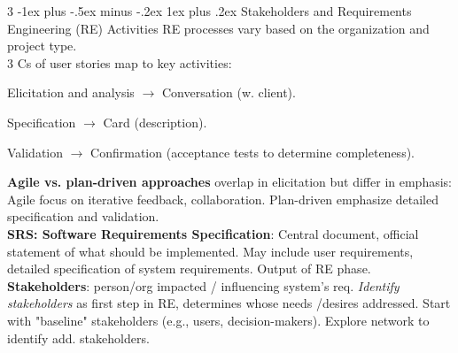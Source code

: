 \documentclass[a4paper, 10pt, landscape]{article}
\makeatletter
\renewcommand{\subsubsection}{\@startsection{subsubsection}{3}{0mm}%
                                {-1ex plus -.5ex minus -.2ex}%
                                {1ex plus .2ex}%
                                {\normalfont\small\bfseries}}
\makeatother
\begin{document}
\begin{multicols*}{3}
\subsubsection{Stakeholders and Requirements Engineering (RE) Activities}
 RE processes vary based on the organization and project type. \\
3 Cs of user stories map to key activities:   \\
\centerline{Elicitation and analysis $\rightarrow$ Conversation (w. client).} 
\centerline{Specification $\rightarrow$ Card (description).}
\centerline{Validation $\rightarrow$ Confirmation (acceptance tests to determine completeness).} \smallskip
\textbf{Agile vs. plan-driven approaches} overlap in elicitation but differ in emphasis: Agile focus on iterative feedback, collaboration. Plan-driven emphasize detailed specification and validation. \\ \smallskip
\textbf{SRS: Software Requirements Specification}: Central document, official statement of what should be implemented. May include user requirements, detailed specification of system requirements. Output of RE phase. \\ \smallskip
\textbf{Stakeholders}: person/org impacted / influencing system’s req. \textit{Identify stakeholders} as first step in RE, determines whose needs /desires addressed. Start with "baseline" stakeholders (e.g., users, decision-makers). Explore network to identify add. stakeholders.
 

\end{multicols*}
\end{document}
